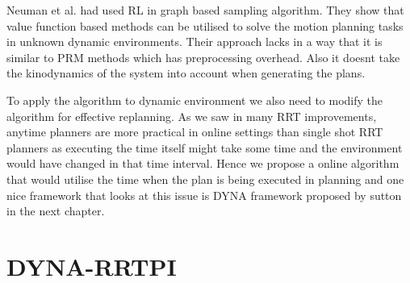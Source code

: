 \documentclass[MTech]{iitmdiss}
\begin{document}
Neuman et al. \cite{neumann07}
 had used RL in graph based sampling algorithm. They show that value function based methods can be utilised to solve the motion planning tasks in unknown dynamic environments. Their approach lacks in a way that it is similar to PRM methods which has preprocessing overhead. Also it doesnt take the kinodynamics of the system into account when generating the plans.

To apply the algorithm to dynamic environment we also need to modify the algorithm for effective replanning. As we saw in many RRT improvements, anytime planners are more practical in online settings than single shot RRT planners as executing the time itself might take some time and the environment would have changed in that time interval. Hence we propose a online algorithm that would utilise the time when the plan is being executed in planning and one nice framework that looks at this issue is DYNA framework proposed by sutton \cite{dyna92} in the next chapter.

\section{DYNA-RRTPI}
\end{document}
